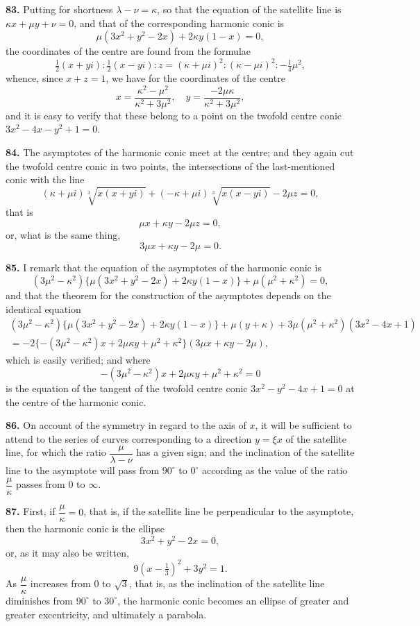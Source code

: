 \documentclass[11pt,a4paper]{article}
\theoremstyle{plain}
\begin{document}
\noindent\textbf{83.} Putting for shortness $\lambda - \nu = \kappa$, so that the equation of the satellite line is $\kappa x + \mu y + \nu = 0$, and that of the corresponding harmonic conic is
\[
\mu(3x^2 + y^2 - 2x) + 2\kappa y(1-x) = 0,
\]
the coordinates of the centre are found from the formulae
\[
\tfrac{1}{2}(x+yi) : \tfrac{1}{2}(x-yi) : z = (\kappa + \mu i)^2 : (\kappa - \mu i)^2 : -\tfrac{1}{4}\mu^2,
\]
whence, since $x + z = 1$, we have for the coordinates of the centre
\[
x = \frac{\kappa^2 - \mu^2}{\kappa^2 + 3\mu^2}, \quad y = \frac{-2\mu\kappa}{\kappa^2 + 3\mu^2},
\]
and it is easy to verify that these belong to a point on the twofold centre conic $3x^2 - 4x - y^2 + 1 = 0$.

\noindent\textbf{84.} The asymptotes of the harmonic conic meet at the centre; and they again cut the twofold centre conic in two points, the intersections of the last-mentioned conic with the line
\[
(\kappa + \mu i)\sqrt[3]{x(x+yi)} + (-\kappa + \mu i)\sqrt[3]{x(x-yi)} - 2\mu z = 0,
\]
that is
\[
\mu x + \kappa y - 2\mu z = 0,
\]
or, what is the same thing,
\[
3\mu x + \kappa y - 2\mu = 0.
\]

\noindent\textbf{85.} I remark that the equation of the asymptotes of the harmonic conic is
\[
(3\mu^2 - \kappa^2)\{\mu(3x^2 + y^2 - 2x) + 2\kappa y(1-x)\} + \mu(\mu^2 + \kappa^2) = 0,
\]
and that the theorem for the construction of the asymptotes depends on the identical equation
\begin{multline*}
(3\mu^2 - \kappa^2)\{\mu(3x^2+y^2-2x) + 2\kappa y(1-x)\} + \mu(y + \kappa) + 3\mu(\mu^2+\kappa^2)(3x^2-4x+1)\\
= -2\{-(3\mu^2-\kappa^2)x + 2\mu\kappa y + \mu^2 + \kappa^2\}(3\mu x + \kappa y - 2\mu),
\end{multline*}
which is easily verified; and where
\[
-(3\mu^2 - \kappa^2)x + 2\mu\kappa y + \mu^2 + \kappa^2 = 0
\]
is the equation of the tangent of the twofold centre conic $3x^2 - y^2 - 4x + 1 = 0$ at the centre of the harmonic conic.

\noindent\textbf{86.} On account of the symmetry in regard to the axis of $x$, it will be sufficient to attend to the series of curves corresponding to a direction $y = \xi x$ of the satellite line, for which the ratio $\dfrac{\mu}{\lambda-\nu}$ has a given sign; and the inclination of the satellite line to the asymptote will pass from $90^{\circ}$ to $0^{\circ}$ according as the value of the ratio $\dfrac{\mu}{\kappa}$ passes from $0$ to $\infty$.

\noindent\textbf{87.} First, if $\dfrac{\mu}{\kappa} = 0$, that is, if the satellite line be perpendicular to the asymptote, then the harmonic conic is the ellipse
\[
3x^2 + y^2 - 2x = 0,
\]
or, as it may also be written,
\[
9(x - \tfrac{1}{3})^2 + 3y^2 = 1.
\]
As $\dfrac{\mu}{\kappa}$ increases from $0$ to $\sqrt{3}$, that is, as the inclination of the satellite line diminishes from $90^{\circ}$ to $30^{\circ}$, the harmonic conic becomes an ellipse of greater and greater excentricity, and ultimately a parabola.
\end{document}
